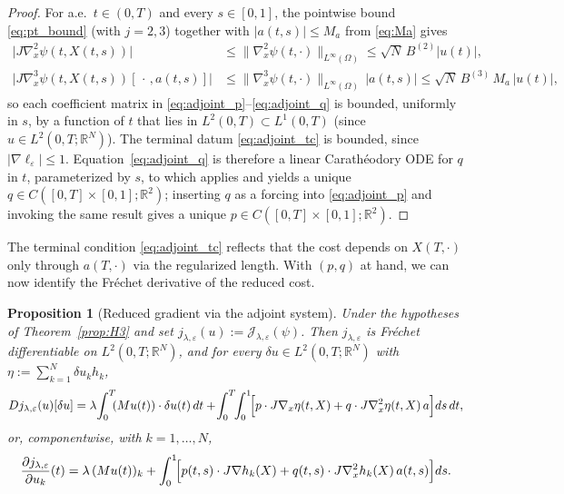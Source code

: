 \documentclass[12pt, reqno]{amsart}
\theoremstyle{plain}
\newtheorem{prop}[thm]{Proposition}
\theoremstyle{definition}
\numberwithin{equation}{section}
\numberwithin{figure}{section}
\numberwithin{algorithm}{section}
\begin{document}
\begin{proof}
For a.e.\ $t\in(0,T)$ and every $s\in[0,1]$, the pointwise bound \eqref{eq:pt_bound} (with $j=2,3$) together with $|a(t,s)|\le M_a$ from \eqref{eq:Ma} gives
\begin{align*}
\bigl|J\nabla_x^2\psi(t,X(t,s))\bigr|
&\le\|\nabla_x^2\psi(t,\cdot)\|_{L^\infty(\Omega)}\le\sqrt N\,B^{(2)}|u(t)|,\\
\bigl|J\nabla_x^3\psi(t,X(t,s))[\,\cdot\,,a(t,s)]\bigr|
&\le\|\nabla_x^3\psi(t,\cdot)\|_{L^\infty(\Omega)}\,|a(t,s)|
\le\sqrt N\,B^{(3)}\,M_a\,|u(t)|,
\end{align*}
so each coefficient matrix in \eqref{eq:adjoint_p}--\eqref{eq:adjoint_q} is bounded, uniformly in $s$, by a function of $t$ that lies in $L^2(0,T)\subset L^1(0,T)$ (since $u\in L^2(0,T;\mathbb R^N)$). The terminal datum \eqref{eq:adjoint_tc} is bounded, since $|\nabla\ell_\varepsilon|\le 1$. Equation~\eqref{eq:adjoint_q} is therefore a linear Carath\'eodory ODE for $q$ in $t$, parameterized by $s$, to which \cite[Ch.~II, Thms.~1.1--2.1]{hartman2002ode} applies and yields a unique $q\in C([0,T]\times[0,1];\mathbb R^2)$; inserting $q$ as a forcing into \eqref{eq:adjoint_p} and invoking the same result gives a unique $p\in C([0,T]\times[0,1];\mathbb R^2)$.
\end{proof}

The terminal condition \eqref{eq:adjoint_tc} reflects that the cost depends on $X(T,\cdot)$ only through $a(T,\cdot)$ via the regularized length. With $(p,q)$ at hand, we can now identify the Fr\'echet derivative of the reduced cost.

\begin{prop}[Reduced gradient via the adjoint system]\label{prop:adjoint}
Under the hypotheses of Theorem~\ref{prop:H3} and set $j_{\lambda,\varepsilon}(u):=\mathcal J_{\lambda,\varepsilon}(\psi)$. Then $j_{\lambda,\varepsilon}$ is Fr\'echet differentiable on $L^2(0,T;\mathbb R^N)$, and for every $\delta u\in L^2(0,T;\mathbb R^N)$ with $\eta:=\sum_{k=1}^N\delta u_k h_k$,
\begin{align}\label{eq:DJ}
Dj_{\lambda,\varepsilon}(u)[\delta u]
=\lambda\!\int_0^T\!\!(Mu(t))\cdot\delta u(t)\,dt
+\!\int_0^T\!\!\int_0^1\!\Bigl[p\cdot J\nabla_x\eta(t,X)+q\cdot J\nabla_x^2\eta(t,X)\,a\Bigr]ds\,dt,
\end{align}
or, componentwise, with $k=1,\dots,N$,
\begin{equation}\label{eq:grad_uk}
\frac{\partial j_{\lambda,\varepsilon}}{\partial u_k}(t)
=\lambda\,(Mu(t))_k+\int_0^1\!\Bigl[p(t,s)\cdot J\nabla h_k(X)+q(t,s)\cdot J\nabla_x^2 h_k(X)\,a(t,s)\Bigr]ds.
\end{equation}
\end{prop}
\end{document}
